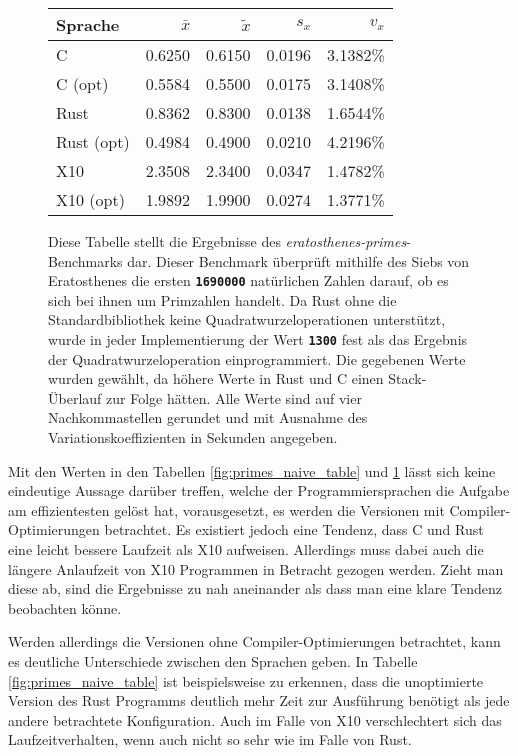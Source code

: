 \begin{figure}[hb]
	\begin{center}
		\begin{tabular}{lrrrr}
			\toprule
			Sprache    & $\bar{x}$ & $\tilde{x}$ & $s_x$ & $v_x$ \\
			\midrule
			C          & 0.6250 & 0.6150 & 0.0196 & 3.1382\% \\
			C (opt)    & 0.5584 & 0.5500 & 0.0175 & 3.1408\% \\
			Rust       & 0.8362 & 0.8300 & 0.0138 & 1.6544\% \\
			Rust (opt) & 0.4984 & 0.4900 & 0.0210 & 4.2196\% \\
			X10        & 2.3508 & 2.3400 & 0.0347 & 1.4782\% \\
			X10 (opt)  & 1.9892 & 1.9900 & 0.0274 & 1.3771\% \\
			\bottomrule
		\end{tabular}
	\end{center}
	\caption{
		Diese Tabelle stellt die Ergebnisse des \textit{eratosthenes-primes}-Benchmarks dar.
		Dieser Benchmark überprüft mithilfe des Siebs von Eratosthenes die ersten \texttt{\textsc{\textbf{1690000}}}
		natürlichen Zahlen darauf, ob es sich bei ihnen um Primzahlen handelt.
		Da Rust ohne die Standardbibliothek keine Quadratwurzeloperationen
		unterstützt, wurde in jeder Implementierung der Wert \texttt{\textsc{\textbf{1300}}} fest als das Ergebnis
		der Quadratwurzeloperation einprogrammiert.
		Die gegebenen Werte wurden gewählt, da höhere Werte in Rust und C einen Stack-Überlauf zur Folge hätten.
		Alle Werte sind auf vier Nachkommastellen gerundet und mit Ausnahme des Variationskoeffizienten
		in Sekunden angegeben.
	}
	\label{fig:primes_eratosthenes_table}
\end{figure}

Mit den Werten in den Tabellen \ref{fig:primes_naive_table} und \ref{fig:primes_eratosthenes_table} lässt sich keine
eindeutige Aussage darüber treffen, welche der Programmiersprachen die Aufgabe am effizientesten
gelöst hat, vorausgesetzt, es werden die Versionen mit Compiler-Optimierungen betrachtet. Es existiert
jedoch eine Tendenz, dass C und Rust eine leicht bessere Laufzeit als X10 aufweisen.
Allerdings muss dabei auch die längere Anlaufzeit von X10 Programmen in Betracht gezogen werden.
Zieht man diese ab, sind die Ergebnisse zu nah aneinander als dass man eine klare Tendenz beobachten könne.

Werden allerdings die Versionen ohne Compiler-Optimierungen betrachtet, kann es deutliche Unterschiede zwischen den
Sprachen geben. In Tabelle \ref{fig:primes_naive_table} ist beispielsweise zu erkennen, dass die unoptimierte
Version des Rust Programms deutlich mehr Zeit zur Ausführung benötigt als jede andere betrachtete
Konfiguration. Auch im Falle von X10 verschlechtert sich das Laufzeitverhalten, wenn auch nicht so
sehr wie im Falle von Rust.

